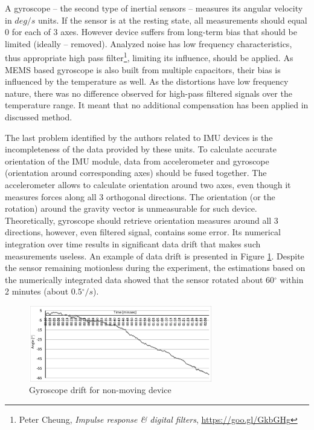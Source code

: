 \documentclass[sensors,article,submit,moreauthors,pdftex,10pt,a4paper]{mdpi}
\newcommand{\degree}{\ensuremath{{}^{\circ}}\xspace}
\begin{document}
A gyroscope – the second type of inertial sensors – measures its angular velocity in $deg/s$  units. If the sensor is at the resting state, all measurements should equal 0 for each of 3 axes. However device suffers from long-term bias that should be limited (ideally – removed). Analyzed noise has low frequency characteristics, thus appropriate high pass filter\footnote{Peter Cheung, \textit{Impulse response \& digital filters}, \url{https://goo.gl/GkbGHg}}, limiting its influence, should be applied. As MEMS based gyroscope is also built from multiple capacitors, their bias is influenced by the temperature as well. As the distortions have low frequency nature, there was no difference observed for high-pass filtered signals over the temperature range. It meant that no additional compensation has been applied in discussed method. 

The last problem identified by the authors related to IMU devices is the incompleteness of the data provided by these units. To calculate accurate orientation of the IMU module, data from accelerometer and gyroscope (orientation around corresponding axes) should be fused together. The accelerometer allows to calculate orientation around two axes, even though it measures forces along all 3 orthogonal directions. The orientation (or the rotation) around the gravity vector is unmeasurable for such device. Theoretically, gyroscope should retrieve orientation measures around all 3 directions, however, even filtered signal, contains some error. Its numerical integration over time results in significant data drift that makes such measurements useless. An example of data drift is presented in Figure \ref{fig:imu:drift}. Despite the sensor remaining motionless during the experiment, the estimations based on the numerically integrated data showed that the sensor rotated about $60\degree$ within 2 minutes (about $0.5\degree/s$).
\begin{figure}[H]
	\centering
	\includegraphics[width=8cm]{Figure7.png}
	\caption{Gyroscope drift for non-moving device}
	\label{fig:imu:drift}
\end{figure}
\end{document}
